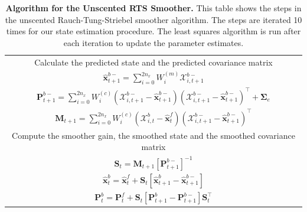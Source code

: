 \documentclass[review,authoryear,3p]{elsarticle}
\begin{document}
\begin{table}[!ht]
\begin{tabular}{|c|}
\multicolumn{1}{|p{16cm}|}{Calculate the predicted state and the predicted covariance matrix}\\
$\hat{\mathbf x}_{t+1}^{b-}=\sum_{i=0}^{2n_x} W_i^{(m)}\mathcal X_{i,t+1}^{b-}$\\
$\mathbf P_{t +1}^{b-}=\sum_{i=0}^{2n_x} W_i^{(c)}(\mathcal X_{i,t+1}^{b-}-\hat{\mathbf x}_{t +1}^{b-})(\mathcal X_{i,t+1}^{b-}-\hat{\mathbf x}_{t +1}^{b-})^\top+\boldsymbol \Sigma_e $\\
$\mathbf M_{t +1}=\sum_{i=0}^{2n_x} W_i^{(c)}(\mathcal X_{i,t}^{b}-\hat{\mathbf x}_{t}^{f})(\mathcal X_{i,t+1}^{b-}-\hat{\mathbf x}_{t+1}^{b-})^\top$\\
\multicolumn{1}{|p{16cm}|}{Compute the smoother gain, the smoothed state and the smoothed covariance matrix}\\
$\mathbf S_t=\mathbf M_{t +1}\left[ \mathbf P_{t +1}^{b-}\right] ^{-1} $\\
$\hat{\mathbf x}_t^b=\hat{\mathbf x}_t^f+\mathbf S_t\left[\hat{\mathbf x}_{t+1}^{b}-\hat{\mathbf x}_{t+1}^{b-}\right]$\\
$\mathbf P_{t}^{b}=\mathbf P_{t}^{f}+\mathbf S_t\left[\mathbf P_{t+1}^{b}-\mathbf P_{t+1}^{b-} \right]\mathbf S_t^\top $\\
\hline
\end{tabular}
\caption{\textbf{Algorithm for the Unscented RTS Smoother.} This table shows the steps in the unscented Rauch-Tung-Striebel smoother algorithm. The steps are iterated 10 times for our state estimation procedure. The least squares algorithm is run after each iteration to update the parameter estimates.}
\label{tab:UKFAlgorithm}
\end{table}
\renewcommand{\arraystretch}{1}
\end{document}
